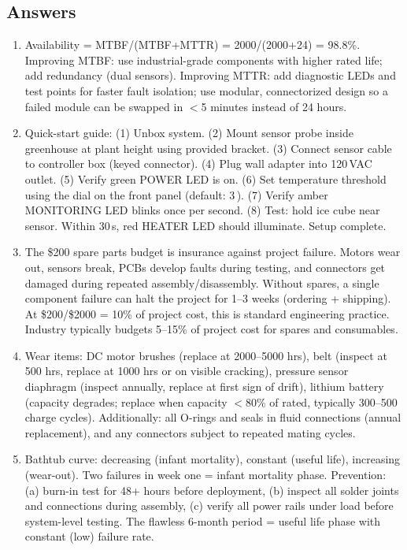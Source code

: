 \subsection{Answers}
\begin{enumerate}[leftmargin=1.5em]
\item Availability = MTBF/(MTBF+MTTR) = 2000/(2000+24) = 98.8\%. Improving MTBF: use industrial-grade components with higher rated life; add redundancy (dual sensors). Improving MTTR: add diagnostic LEDs and test points for faster fault isolation; use modular, connectorized design so a failed module can be swapped in $<$5 minutes instead of 24 hours.
\item Quick-start guide: (1) Unbox system. (2) Mount sensor probe inside greenhouse at plant height using provided bracket. (3) Connect sensor cable to controller box (keyed connector). (4) Plug wall adapter into 120\,VAC outlet. (5) Verify green POWER LED is on. (6) Set temperature threshold using the dial on the front panel (default: 3\,\degC{}). (7) Verify amber MONITORING LED blinks once per second. (8) Test: hold ice cube near sensor. Within 30\,s, red HEATER LED should illuminate. Setup complete.
\item The \$200 spare parts budget is insurance against project failure. Motors wear out, sensors break, PCBs develop faults during testing, and connectors get damaged during repeated assembly/disassembly. Without spares, a single component failure can halt the project for 1--3 weeks (ordering + shipping). At \$200/\$2000 = 10\% of project cost, this is standard engineering practice. Industry typically budgets 5--15\% of project cost for spares and consumables.
\item Wear items: DC motor brushes (replace at 2000--5000 hrs), belt (inspect at 500 hrs, replace at 1000 hrs or on visible cracking), pressure sensor diaphragm (inspect annually, replace at first sign of drift), lithium battery (capacity degrades; replace when capacity $<$80\% of rated, typically 300--500 charge cycles). Additionally: all O-rings and seals in fluid connections (annual replacement), and any connectors subject to repeated mating cycles.
\item Bathtub curve: decreasing (infant mortality), constant (useful life), increasing (wear-out). Two failures in week one = infant mortality phase. Prevention: (a) burn-in test for 48+ hours before deployment, (b) inspect all solder joints and connections during assembly, (c) verify all power rails under load before system-level testing. The flawless 6-month period = useful life phase with constant (low) failure rate.

\end{enumerate}

